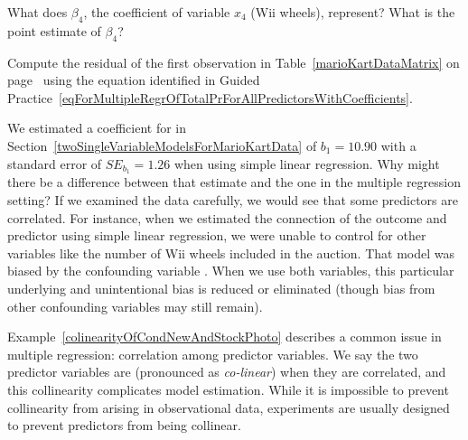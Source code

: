 \begin{exercisewrap}
\begin{nexercise}
What does $\beta_4$, the coefficient of variable $x_4$ (Wii wheels), represent? What is the point estimate of $\beta_4$?\footnotemark
\end{nexercise}
\end{exercisewrap}

\begin{exercisewrap}
\begin{nexercise} \label{computeMultipleRegressionResidualForMarioKart}%
Compute the residual of the first observation in Table~\ref{marioKartDataMatrix} on page~\pageref{marioKartDataMatrix} using the equation identified in Guided Practice~\ref{eqForMultipleRegrOfTotalPrForAllPredictorsWithCoefficients}.\footnotemark
\end{nexercise}
\end{exercisewrap}

\begin{examplewrap}
\begin{nexample}{We estimated a coefficient for  in Section~\ref{twoSingleVariableModelsForMarioKartData} of $b_1 = 10.90$ with a standard error of $SE_{b_1} = 1.26$ when using simple linear regression. Why might there be a difference between that estimate and the one in the multiple regression setting?} \label{colinearityOfCondNewAndStockPhoto}
If we examined the data carefully, we would see that some predictors are correlated. For instance, when we estimated the connection of the outcome  and predictor  using simple linear regression, we were unable to control for other variables like the number of Wii wheels included in the auction. That model was biased by the confounding variable . When we use both variables, this particular underlying and unintentional bias is reduced or eliminated (though bias from other confounding variables may still remain).
\end{nexample}
\end{examplewrap}

Example~\ref{colinearityOfCondNewAndStockPhoto} describes a common issue in multiple regression: correlation among predictor variables. We say the two predictor variables are  (pronounced as \emph{co-linear}) when they are correlated, and this collinearity complicates model estimation. While it is impossible to prevent collinearity from arising in observational data, experiments are usually designed to prevent predictors from being collinear.

